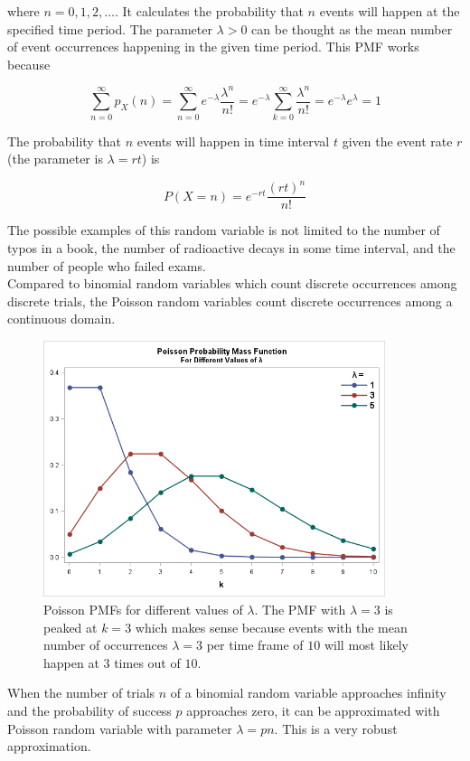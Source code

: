 \documentclass[12pt, a4paper]{article}
\newcounter{exa}
\begin{document}
where $n=0,1,2,\dots$. It calculates the probability that $n$ events will happen at the specified time period. The parameter $\lambda>0$ can be thought as the mean number of event occurrences happening in the given time period. This PMF works because

$$\sum_{n=0}^\infty p_X(n) = \sum_{n=0}^\infty e^{-\lambda}\frac{\lambda^n}{n!} = e^{-\lambda} \sum_{k=0}^\infty \frac{\lambda^n}{n!}=e^{-\lambda}e^\lambda=1$$

The probability that $n$ events will happen in time interval $t$ given the event rate $r$ (the parameter is $\lambda=rt$) is

$$P(X=n)=e^{-rt}\frac{(rt)^n}{n!}$$

The possible examples of this random variable is not limited to the number of typos in a book, the number of radioactive decays in some time interval, and the number of people who failed exams. \\

Compared to binomial random variables which count discrete occurrences among discrete trials, the Poisson random variables count discrete occurrences among a continuous domain.

\begin{figure}[H]
\centering
\includegraphics[width=100mm]{11.png}
\caption{Poisson PMFs for different values of $\lambda$. The PMF with $\lambda=3$ is peaked at $k=3$ which makes sense because events with the mean number of occurrences $\lambda=3$ per time frame of $10$ will most likely happen at $3$ times out of $10$.}
\end{figure}

When the number of trials $n$ of a binomial random variable approaches infinity and the probability of success $p$ approaches zero, it can be approximated with Poisson random variable with parameter $\lambda=pn$. This is a very robust approximation. \\
\end{document}
